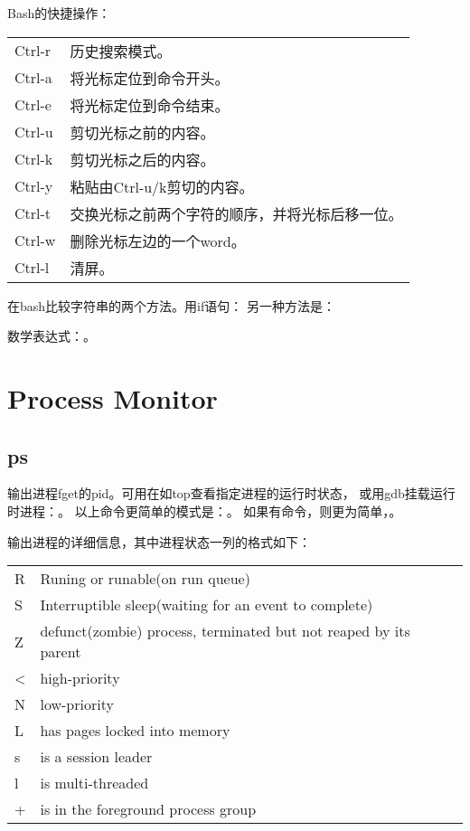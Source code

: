 Bash的快捷操作：\\
\begin{tabular}{ll}
Ctrl-r  & 历史搜索模式。\\
Ctrl-a  & 将光标定位到命令开头。\\
Ctrl-e  & 将光标定位到命令结束。\\
Ctrl-u  & 剪切光标之前的内容。\\
Ctrl-k  & 剪切光标之后的内容。\\
Ctrl-y  & 粘贴由Ctrl-u/k剪切的内容。\\
Ctrl-t  & 交换光标之前两个字符的顺序，并将光标后移一位。\\
Ctrl-w  & 删除光标左边的一个word。\\
Ctrl-l  & 清屏。\\
\end{tabular}

在bash比较字符串的两个方法。用if语句：
另一种方法是：

数学表达式：。

\section{Process Monitor}

\subsection{ps}
输出进程fget的pid。可用在如top查看指定进程的运行时状态，
或用gdb挂载运行时进程：。
以上命令更简单的模式是：。
如果有命令，则更为简单，。

输出进程的详细信息，其中进程状态一列的格式如下：\\
\begin{tabular}{ll} \hline
R   & Runing or runable(on run queue)\\
S   & Interruptible sleep(waiting for an event to complete) \\
Z   & defunct(zombie) process, terminated but not reaped by its parent \\\hline
<   & high-priority\\
N   & low-priority\\
L   & has pages locked into memory\\
s   & is a session leader\\
l   & is multi-threaded\\
+   & is in the foreground process group\\
\end{tabular}

